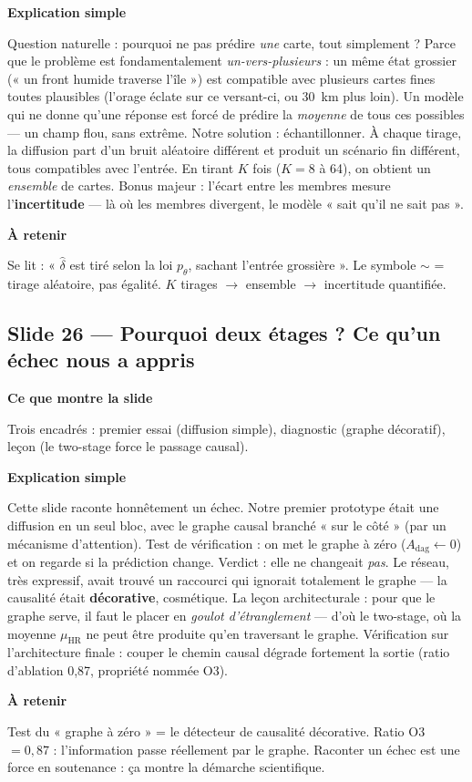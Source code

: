 \documentclass[11pt,a4paper]{article}
\newcommand{\slide}[2]{\subsection*{\textcolor{bleu}{Slide #1 --- #2}}}
\newcommand{\bloc}[1]{\par\medskip\noindent\textcolor{accent}{\textbf{#1}}\par\nopagebreak\smallskip}
\begin{document}
\bloc{Explication simple}
Question naturelle : pourquoi ne pas prédire \emph{une} carte, tout simplement ? Parce que le problème est fondamentalement \emph{un-vers-plusieurs} : un même état grossier (« un front humide traverse l'île ») est compatible avec plusieurs cartes fines toutes plausibles (l'orage éclate sur ce versant-ci, ou 30~km plus loin). Un modèle qui ne donne qu'une réponse est forcé de prédire la \emph{moyenne} de tous ces possibles --- un champ flou, sans extrême. Notre solution : échantillonner. À chaque tirage, la diffusion part d'un bruit aléatoire différent et produit un scénario fin différent, tous compatibles avec l'entrée. En tirant $K$ fois ($K = 8$ à 64), on obtient un \emph{ensemble} de cartes. Bonus majeur : l'écart entre les membres mesure l'\textbf{incertitude} --- là où les membres divergent, le modèle « sait qu'il ne sait pas ».

\bloc{À retenir}
Se lit : « $\widehat\delta$ est tiré selon la loi $p_\theta$, sachant l'entrée grossière ». Le symbole $\sim$ = tirage aléatoire, pas égalité. $K$ tirages $\to$ ensemble $\to$ incertitude quantifiée.

\slide{26}{Pourquoi deux étages ? Ce qu'un échec nous a appris}

\bloc{Ce que montre la slide}
Trois encadrés : premier essai (diffusion simple), diagnostic (graphe décoratif), leçon (le two-stage force le passage causal).

\bloc{Explication simple}
Cette slide raconte honnêtement un échec. Notre premier prototype était une diffusion en un seul bloc, avec le graphe causal branché « sur le côté » (par un mécanisme d'attention). Test de vérification : on met le graphe à zéro ($A_{\mathrm{dag}} \leftarrow 0$) et on regarde si la prédiction change. Verdict : elle ne changeait \emph{pas}. Le réseau, très expressif, avait trouvé un raccourci qui ignorait totalement le graphe --- la causalité était \textbf{décorative}, cosmétique. La leçon architecturale : pour que le graphe serve, il faut le placer en \emph{goulot d'étranglement} --- d'où le two-stage, où la moyenne $\mu_{\mathrm{HR}}$ ne peut être produite qu'en traversant le graphe. Vérification sur l'architecture finale : couper le chemin causal dégrade fortement la sortie (ratio d'ablation 0{,}87, propriété nommée O3).

\bloc{À retenir}
Test du « graphe à zéro » = le détecteur de causalité décorative. Ratio O3 $= 0{,}87$ : l'information passe réellement par le graphe. Raconter un échec est une force en soutenance : ça montre la démarche scientifique.
\end{document}
